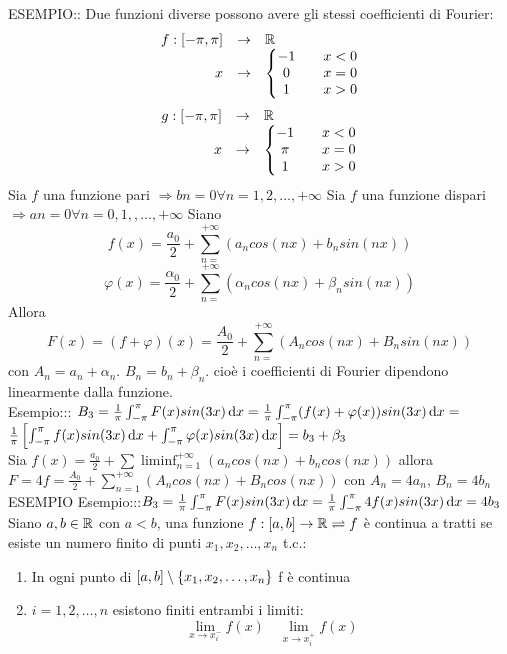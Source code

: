 ESEMPIO:: Due funzioni diverse possono avere gli stessi coefficienti di Fourier:
$$\begin{array}{rcl} f: \left[-\pi,\pi\right] & \to &  \mathbb{R} \\
x & \to & \left\{\begin{matrix} -1 && x<0\\0&&x= 0\\1&&x>0 \end{matrix}\right.\end{array}$$
$$\begin{array}{rcl} g: \left[-\pi,\pi\right] & \to &  \mathbb{R} \\
x & \to & \left\{\begin{matrix} -1 && x<0\\\pi&&x= 0\\1&&x>0 \end{matrix}\right.\end{array}$$
\observation
Sia $f$ una funzione pari $\Rightarrow bn=0 \forall n=1,2,\ldots,+\infty$
\observation
Sia $f$ una funzione dispari $\Rightarrow an=0 \forall n=0,1,,\ldots,+\infty$
\observation
Siano 
$$f(x)=\frac{a_0}{2}+\sum\limits_{n=}^{+\infty}\left(a_ncos(nx)+b_nsin(nx)\right)$$
$$\varphi(x)=\frac{\alpha_0}{2}+\sum\limits_{n=}^{+\infty}\left(\alpha_ncos(nx)+\beta_nsin(nx)\right)$$
Allora
$$ F(x)=(f+\varphi)(x)=\frac{A_0}{2}+\sum\limits_{n=}^{+\infty}\left(A_ncos(nx)+B_nsin(nx)\right)$$
con $A_n=a_n+\alpha_n$. $B_n=b_n+\beta_n$.
cioè i coefficienti di Fourier dipendono linearmente dalla funzione.\\
Esempio::: $B_3=\frac{1}{\pi}\int_{-\pi}^{\pi}F(x)sin(3x)\,\mathrm{d}{x}=\frac{1}{\pi}\int_{-\pi}^{\pi}(f(x)+\varphi(x))sin(3x)\,\mathrm{d}{x}=$\\
$\frac{1}{\pi}\left[\int_{-\pi}^{\pi}f(x)sin(3x)\,\mathrm{d}{x}+\int_{-\pi}^{\pi}\varphi(x)sin(3x)\,\mathrm{d}{x}\right]=b_3+\beta_3$\\
Sia $f(x)=\frac{a_0}{2}+\sum\liminf_{n=1}^{+\infty}\left(a_ncos(nx)+b_ncos(nx)\right)$ allora $F=4f=\frac{A_0}{2}+\sum\limits_{n=1}^{+\infty}\left(A_ncos(nx)+B_ncos(nx)\right)$ con $A_n=4a_n$, $B_n=4b_n$\\
ESEMPIO
Esempio:::$B_3=\frac{1}{\pi}\int_{-\pi}^{\pi}F(x)sin(3x)\,\mathrm{d}{x}=\frac{1}{\pi}\int_{-\pi}^{\pi}4f(x)sin(3x)\,\mathrm{d}{x}=4b_3$\\
Siano $a,b\in \mathbb{R}$ con $a<b$, una funzione $f:\left[a,b\right]\to \mathbb{R}\rightleftharpoons f$ è continua a tratti se esiste un numero finito di punti $x_1,x_2,\ldots,x_n$ t.c.:\\
\begin{enumerate}
	\item In ogni punto di $\left[a,b\right]\setminus\left\{x_1,x_2,\ldots,x_n\right\}$ f è continua
	\item $i=1,2,\ldots,n$ esistono finiti entrambi i limiti:
	$$\lim\limits_{x\to x_i^{-}}f(x)\quad \lim\limits_{x\to x_i^{+}}f(x)$$
\end{enumerate}

